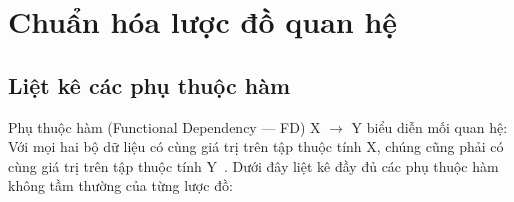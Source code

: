 \documentclass[11pt]{report}
\begin{document}

\section{Chuẩn hóa lược đồ quan hệ}
\label{sec:chuanhoa}

\subsection{Liệt kê các phụ thuộc hàm}
\label{subsec:pth}

Phụ thuộc hàm (Functional Dependency --- FD) X $\rightarrow$ Y biểu diễn mối quan hệ: Với mọi hai bộ dữ liệu có cùng giá trị trên tập thuộc tính X, chúng cũng phải có cùng giá trị trên tập thuộc tính Y~\cite{elmasri2015fundamentals}. Dưới đây liệt kê đầy đủ các phụ thuộc hàm không tầm thường của từng lược đồ:
\end{document}

